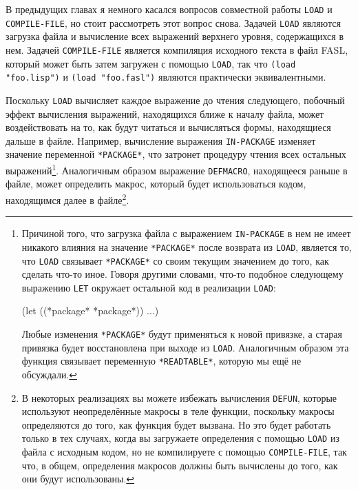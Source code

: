 В предыдущих главах я немного касался вопросов совместной работы \lstinline{LOAD} и
\lstinline{COMPILE-FILE}, но стоит рассмотреть этот вопрос снова.  Задачей \lstinline{LOAD} являются
загрузка файла и вычисление всех выражений верхнего уровня, содержащихся в нем.  Задачей
\lstinline{COMPILE-FILE} является компиляция исходного текста в файл FASL, который может быть
затем загружен с помощью \lstinline{LOAD}, так что \lstinline{(load "foo.lisp")} и 
\lstinline{(load "foo.fasl")} являются практически эквивалентными.

Поскольку \lstinline{LOAD} вычисляет каждое выражение до чтения следующего, побочный эффект
вычисления выражений, находящихся ближе к началу файла, может воздействовать на то, как
будут читаться и вычисляться формы, находящиеся дальше в файле.  Например, вычисление
выражения \lstinline{IN-PACKAGE} изменяет значение переменной \lstinline{*PACKAGE*}, что затронет
процедуру чтения всех остальных выражений\footnote{Причиной того, что загрузка файла с
  выражением \lstinline{IN-PACKAGE} в нем не имеет никакого влияния на значение
  \lstinline{*PACKAGE*} после возврата из \lstinline{LOAD}, является то, что \lstinline{LOAD} связывает
  \lstinline{*PACKAGE*} со своим текущим значением до того, как сделать что-то иное.  Говоря
  другими словами, что-то подобное следующему выражению \lstinline{LET} окружает остальной код
  в реализации \lstinline{LOAD}:

\begin{myverb}
(let ((*package* *package*)) ...)
\end{myverb}

Любые изменения \lstinline{*PACKAGE*} будут применяться к новой привязке, а старая привязка
будет восстановлена при выходе из \lstinline{LOAD}.  Аналогичным образом эта функция связывает
переменную \lstinline{*READTABLE*}, которую мы ещё не обсуждали.}.  Аналогичным образом
выражение \lstinline{DEFMACRO}, находящееся раньше в файле, может определить макрос, который
будет использоваться кодом, находящимся далее в файле\footnote{В некоторых реализациях вы
  можете избежать вычисления \lstinline{DEFUN}, которые используют
  неопределённые макросы в теле функции, поскольку макросы определяются до того, как
  функция будет вызвана.  Но это будет работать только в тех случаях, когда вы загружаете
  определения с помощью \lstinline{LOAD} из файла с исходным кодом, но не компилируете с
  помощью \lstinline{COMPILE-FILE}, так что, в общем, определения макросов должны быть вычислены
  до того, как они будут использованы.}.

